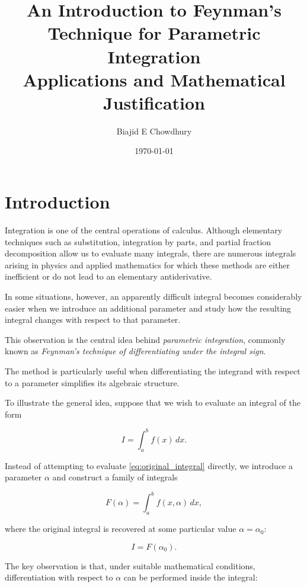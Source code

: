 \documentclass[11pt,a4paper]{article}
\title{\textbf{An Introduction to Feynman's
Technique for Parametric Integration}\\[0.3cm]
\large Applications and Mathematical Justification}
\author{Biajid E Chowdhury}
\date{\today}
\theoremstyle{definition}
\theoremstyle{remark}
\begin{document}
\maketitle


\section{Introduction}

Integration is one of the central operations of
calculus. Although elementary techniques such as
substitution, integration by parts, and partial
fraction decomposition allow us to evaluate many
integrals, there are numerous integrals arising
in physics and applied mathematics for which
these methods are either inefficient or do not
lead to an elementary antiderivative.

In some situations, however, an apparently
difficult integral becomes considerably easier
when we introduce an additional parameter and
study how the resulting integral changes with
respect to that parameter.

This observation is the central idea behind
\emph{parametric integration}, commonly known
as \emph{Feynman's technique of differentiating
under the integral sign}.

The method is particularly useful when
differentiating the integrand with respect to
a parameter simplifies its algebraic structure.

To illustrate the general idea, suppose that
we wish to evaluate an integral of the form

\begin{equation}
    I=\int_a^b f(x)\,dx.
    \label{eq:original_integral}
\end{equation}

Instead of attempting to evaluate
\eqref{eq:original_integral} directly, we
introduce a parameter $\alpha$ and construct
a family of integrals

\begin{equation}
    F(\alpha)
    =
    \int_a^b f(x,\alpha)\,dx,
    \label{eq:parametric_integral}
\end{equation}

where the original integral is recovered at
some particular value $\alpha=\alpha_0$:

\[
    I=F(\alpha_0).
\]

The key observation is that, under suitable
mathematical conditions, differentiation
with respect to $\alpha$ can be performed
inside the integral:
\end{document}
